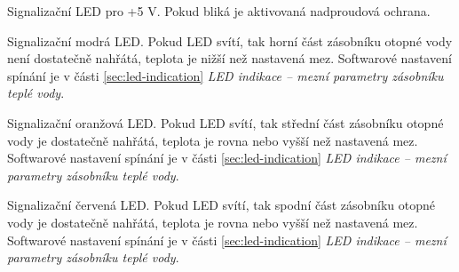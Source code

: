 \begin{Czech}
Signalizační LED pro +5 V. Pokud bliká je aktivovaná nadproudová ochrana.
\end{Czech}

\newpage
\begin{Czech}
Signalizační modrá LED. Pokud LED svítí, tak horní část zásobníku otopné vody není dostatečně nahřátá, teplota je nižší než nastavená mez. Softwarové nastavení spínání je v části \ref{sec:led-indication} \textit{LED indikace – mezní parametry zásobníku teplé vody}.
\end{Czech}

\begin{Czech}
Signalizační oranžová LED. Pokud LED svítí, tak střední část zásobníku otopné vody je dostatečně nahřátá, teplota je rovna nebo vyšší než nastavená mez. Softwarové nastavení spínání je v části \ref{sec:led-indication} \textit{LED indikace – mezní parametry zásobníku teplé vody}.
\end{Czech}

\begin{Czech}
Signalizační červená LED. Pokud LED svítí, tak spodní část zásobníku otopné vody je dostatečně nahřátá, teplota je rovna nebo vyšší než nastavená mez. Softwarové nastavení spínání je v části \ref{sec:led-indication} \textit{LED indikace – mezní parametry zásobníku teplé vody}.
\end{Czech}

